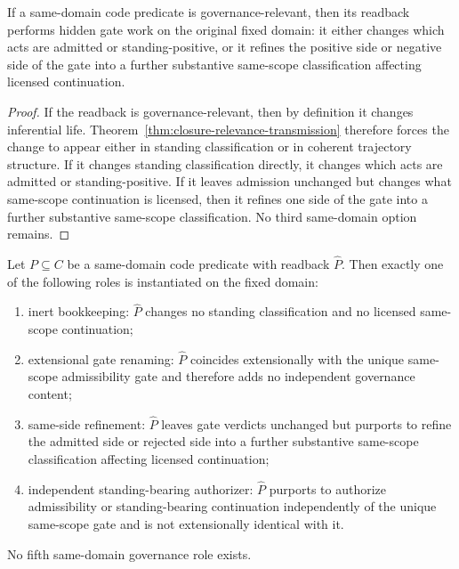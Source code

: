 \begin{lemma}
\label{lem:hidden-gate-work}
If a same-domain code predicate is governance-relevant, then its readback performs hidden gate work on the original fixed domain: it either changes which acts are admitted or standing-positive, or it refines the positive side or negative side of the gate into a further substantive same-scope classification affecting licensed continuation.
\end{lemma}

\begin{proof}
If the readback is governance-relevant, then by definition it changes inferential life. Theorem~\ref{thm:closure-relevance-transmission} therefore forces the change to appear either in standing classification or in coherent trajectory structure. If it changes standing classification directly, it changes which acts are admitted or standing-positive. If it leaves admission unchanged but changes what same-scope continuation is licensed, then it refines one side of the gate into a further substantive same-scope classification. No third same-domain option remains.
\end{proof}

\begin{theorem}
\label{thm:code-role-exhaustion}
Let $P\subseteq C$ be a same-domain code predicate with readback $\widehat P$. Then exactly one of the following roles is instantiated on the fixed domain:
\begin{enumerate}
  \item inert bookkeeping: $\widehat P$ changes no standing classification and no licensed same-scope continuation;
  \item extensional gate renaming: $\widehat P$ coincides extensionally with the unique same-scope admissibility gate and therefore adds no independent governance content;
  \item same-side refinement: $\widehat P$ leaves gate verdicts unchanged but purports to refine the admitted side or rejected side into a further substantive same-scope classification affecting licensed continuation;
  \item independent standing-bearing authorizer: $\widehat P$ purports to authorize admissibility or standing-bearing continuation independently of the unique same-scope gate and is not extensionally identical with it.
\end{enumerate}
No fifth same-domain governance role exists.
\end{theorem}

